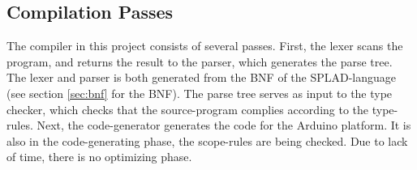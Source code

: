 \subsection{Compilation Passes}
\label{sec:CompilationPasses}
The compiler in this project consists of several passes. First, the lexer scans the program, and returns the result to the parser, which generates the parse tree. The lexer and parser is both generated from the BNF of the SPLAD-language (see section \ref{sec:bnf} for the BNF). The parse tree serves as input to the type checker, which checks that the source-program complies according to the type-rules. Next, the code-generator generates the code for the Arduino platform. It is also in the code-generating phase, the scope-rules are being checked. Due to lack of time, there is no optimizing phase. 